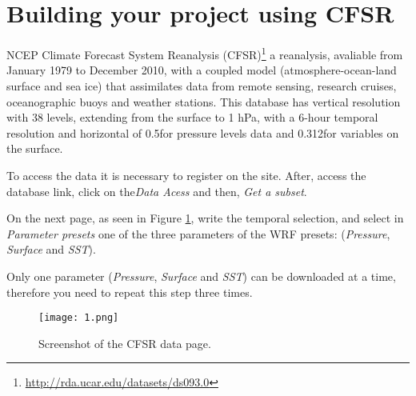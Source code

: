 \section{Building your project using CFSR}
\bigskip

\noindent NCEP Climate Forecast System Reanalysis 
(CFSR)\textcolor{bleu_cite}{\textit{}\footnote{\textcolor{bleu_cite}{\href{http://rda.ucar.edu/datasets/ds093.0}{http://rda.ucar.edu/datasets/ds093.0}}}}
a reanalysis, avaliable from January 1979 to December 2010, with a coupled model (atmosphere-ocean-land surface and sea ice) that
assimilates data from remote sensing, research cruises, oceanographic buoys and weather stations. This database
has vertical resolution with 38 levels, extending from the surface to 1 hPa, with a 6-hour temporal resolution
and horizontal of 0.5\degree for pressure levels data and 0.312\degree for variables on the surface.
\bigskip

\noindent To access the data it is necessary to register on the site. After, access the database link,
click on the\textit{Data Acess} and then, \textit{Get a subset}.
\bigskip

\noindent On the next page, as seen in Figure \textcolor{bleu_cite}{\ref{detalhacfsr}}, write the temporal selection,
and select in \textit {Parameter presets} one of the three parameters of the WRF presets: (\textit{Pressure},
\textit{Surface} and \textit{SST}). 
\bigskip

\begin{tcolorbox}[enhanced,
    grow to left by=0cm,%
    grow to right by=0cm,%
    enlarge top by=0cm,%
    enlarge bottom by=0cm,%
    tcbox raise base,
    boxrule=1.0pt,
    left=18mm,
    colframe=red!50!black,coltext=red!25!black,colback=red!10!white,
    overlay={\begin{tcbclipinterior}\fill[red!75!blue!50!white] (frame.south west)
      rectangle node[text=white,font=\sffamily\bfseries\footnotesize,rotate=0] {WARNING} ([xshift=18mm]frame.north west);\end{tcbclipinterior}}]
      Only one parameter (\textit{Pressure}, \textit{Surface} and \textit{SST}) can be downloaded at a time, therefore you need to repeat this step three times.
\end{tcolorbox}
\bigskip

\begin{figure}[H]
    \centering
    \texttt{[image: 1.png]}
    \caption{Screenshot of the CFSR data page.}
    \label{detalhacfsr}
\end{figure}
\bigskip

